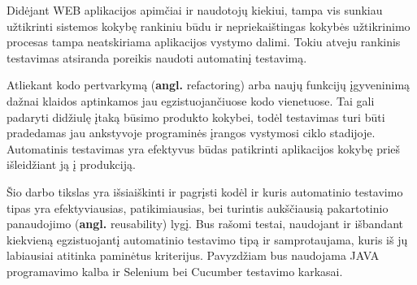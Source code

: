 Didėjant WEB aplikacijos apimčiai ir naudotojų kiekiui, tampa vis sunkiau užtikrinti sistemos kokybę rankiniu būdu ir nepriekaištingas kokybės užtikrinimo procesas tampa neatskiriama aplikacijos vystymo dalimi. Tokiu atveju rankinis testavimas atsiranda poreikis naudoti automatinį testavimą.

Atliekant kodo pertvarkymą (\textbf{angl.} refactoring) arba naujų funkcijų įgyveninimą dažnai klaidos aptinkamos jau egzistuojančiuose kodo vienetuose. Tai gali padaryti didžiulę įtaką būsimo produkto kokybei, todėl testavimas turi būti pradedamas jau ankstyvoje programinės įrangos vystymosi ciklo stadijoje. Automatinis testavimas yra efektyvus būdas patikrinti aplikacijos kokybę prieš išleidžiant ją į produkciją.

Šio darbo tikslas yra išsiaiškinti ir pagrįsti kodėl ir kuris automatinio testavimo tipas yra efektyviausias, patikimiausias, bei turintis aukščiausią pakartotinio panaudojimo (\textbf{angl.} reusability) lygį. Bus rašomi testai, naudojant ir išbandant kiekvieną egzistuojantį automatinio testavimo tipą ir samprotaujama, kuris iš jų labiausiai atitinka paminėtus kriterijus. Pavyzdžiam bus naudojama JAVA programavimo kalba ir Selenium bei Cucumber testavimo karkasai.